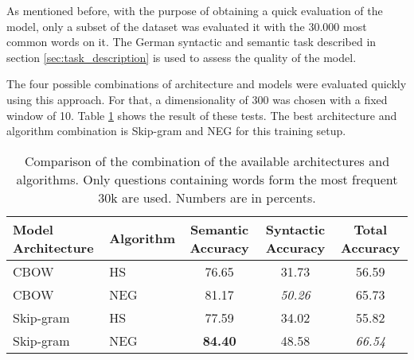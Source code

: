 As mentioned before, with the purpose of obtaining  a quick evaluation of the
model, only a subset of the dataset was evaluated it with the 30.000 
most common words on it. The German syntactic and semantic task described in
section \ref{sec:task_description} is used  to assess the quality of the
model. 

The four possible combinations of architecture and models were evaluated
quickly using this approach. For that, a dimensionality of 300 was chosen with
a fixed window of 10. Table \ref{tab:initial_w2v_comparison} shows the result
of these tests. The best architecture and algorithm combination is
Skip-gram and \ac{NEG} for this training setup.








\begin{table}[h]
\centering
\caption{Comparison of the combination of the available architectures and algorithms.
 Only questions containing words form the most  frequent 30k are used.
 Numbers are in percents.} 
\label{tab:initial_w2v_comparison}


\begin{center}
\small

\begin{tabular}{|l|l|c|c|c|}
\hline
 Model Architecture  &   Algorithm  &  Semantic Accuracy  &  Syntactic Accuracy  &  Total Accuracy  \\
\hline
 CBOW               &  HS                   &              76.65  &               31.73  &           56.59  \\
 CBOW               &  NEG                  &              81.17  &               \textit{50.26}  &           65.73  \\
 Skip-gram          &  HS                   &              77.59  &               34.02  &           55.82  \\
 Skip-gram          &  NEG                  &              \textbf{84.40}  &               48.58  &           \textit{66.54}  \\
\hline
\end{tabular}
\end{center}

\end{table}


